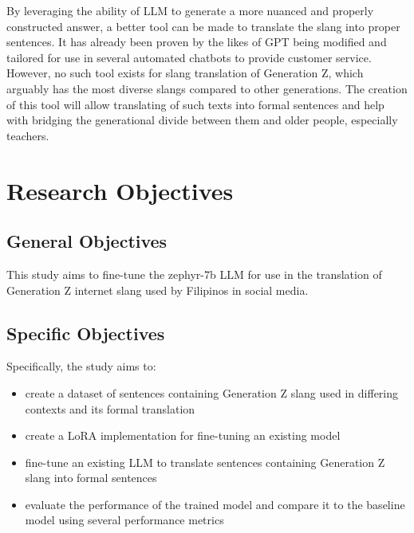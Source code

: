 By leveraging the ability of LLM to generate a more nuanced and properly constructed answer, a better tool can be made to translate the slang into proper sentences.
It has already been proven by the likes of GPT being modified and tailored for use in several automated chatbots to provide customer service.
However, no such tool exists for slang translation of Generation Z, which arguably has the most diverse slangs compared to other generations.
The creation of this tool will allow translating of such texts into formal sentences and help with bridging the generational divide between them and older people, especially teachers. 

\section{Research Objectives}
\label{sec:research_objectives}

\subsection{General Objectives}
\label{sec:general_objectives}
This study aims to fine-tune the zephyr-7b LLM for use in the translation of Generation Z internet slang used by Filipinos in social media.
\subsection{Specific Objectives}
\label{sec:specific_objectives}
Specifically, the study aims to:
\begin{itemize}
	\item create a dataset of sentences containing Generation Z slang used in differing contexts and its formal translation
	\item create a LoRA implementation for fine-tuning an existing model
	\item fine-tune an existing LLM to translate sentences containing Generation Z slang into formal sentences
	\item evaluate the performance of the trained model and compare it to the baseline model using several performance metrics
\end{itemize}

